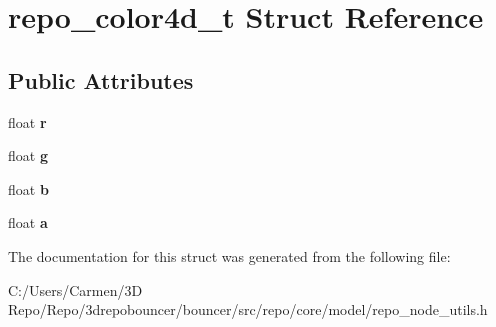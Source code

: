 \hypertarget{structrepo__color4d__t}{}\section{repo\+\_\+color4d\+\_\+t Struct Reference}
\label{structrepo__color4d__t}
\subsection*{Public Attributes}
\begin{DoxyCompactItemize}
\item 
\hypertarget{structrepo__color4d__t_a49e81f544a6356ce280f7e8365d17373}{}float {\bfseries r}\label{structrepo__color4d__t_a49e81f544a6356ce280f7e8365d17373}

\item 
\hypertarget{structrepo__color4d__t_adcc911902da587a5b4578ff32e34dc20}{}float {\bfseries g}\label{structrepo__color4d__t_adcc911902da587a5b4578ff32e34dc20}

\item 
\hypertarget{structrepo__color4d__t_a8a53e5ac55404a0e706be135be06d992}{}float {\bfseries b}\label{structrepo__color4d__t_a8a53e5ac55404a0e706be135be06d992}

\item 
\hypertarget{structrepo__color4d__t_aed28c0ac51b30c80377a6e460fa11171}{}float {\bfseries a}\label{structrepo__color4d__t_aed28c0ac51b30c80377a6e460fa11171}

\end{DoxyCompactItemize}


The documentation for this struct was generated from the following file\+:\begin{DoxyCompactItemize}
\item 
C\+:/\+Users/\+Carmen/3\+D Repo/\+Repo/3drepobouncer/bouncer/src/repo/core/model/repo\+\_\+node\+\_\+utils.\+h\end{DoxyCompactItemize}
